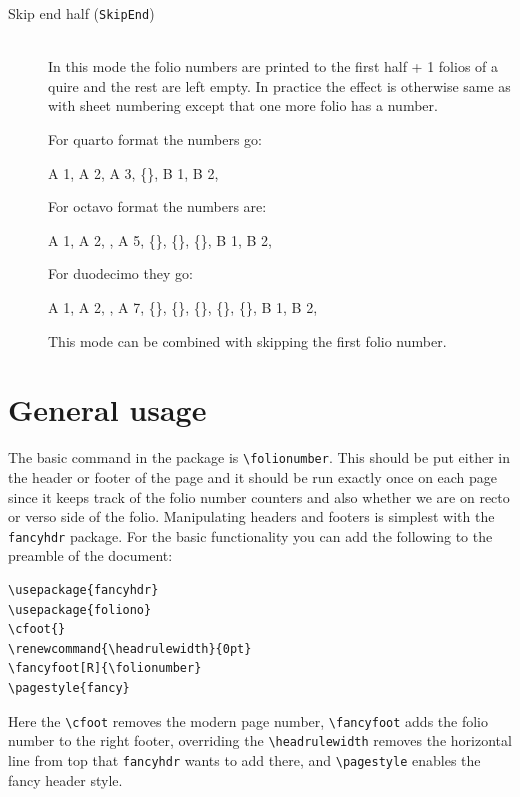\documentclass[a4paper, 12pt]{article}
\newcommand{\feature}[1]{\texttt{#1}}
\newcommand{\command}[1]{\texttt{\textbackslash{}#1}}
\begin{document}
\begin{description}
\item [Skip end half (\feature{SkipEnd})] \mbox{} \\
  In this mode the folio numbers are printed to the first half + 1
  folios of a quire and the rest are left empty. In practice the
  effect is otherwise same as with sheet numbering except that one
  more folio has a number.

  For quarto format the numbers go:
  \begin{center}
    A 1, A 2, A 3,  \{\}, B 1, B 2, \textellipsis
  \end{center}
  For octavo format the numbers are:
  \begin{center}
    A 1, A 2, \textellipsis, A 5,  \{\},  \{\},  \{\}, B 1, B 2, \textellipsis
  \end{center}
  For duodecimo they go:
  \begin{center}
    A 1, A 2, \textellipsis, A 7,  \{\},  \{\},  \{\}, \{\}, \{\}, B 1, B 2, \textellipsis
  \end{center}
  This mode can be combined with skipping the first folio number.   

\end{description}

\section{General usage}

The basic command in the package is \command{folionumber}. This should
be put either in the header or footer of the page and it should be run
exactly once on each page since it keeps track of the folio number
counters and also whether we are on recto or verso side of the folio.
Manipulating headers and footers is simplest with the
\feature{fancyhdr} package. For the basic functionality you can add
the following to the preamble of the document:

\begin{verbatim}
\usepackage{fancyhdr}
\usepackage{foliono}
\cfoot{}
\renewcommand{\headrulewidth}{0pt}
\fancyfoot[R]{\folionumber}
\pagestyle{fancy}
\end{verbatim}

Here the \command{cfoot} removes the modern page number,
\command{fancyfoot} adds the folio number to the right footer,
overriding the \command{headrulewidth} removes the horizontal line
from top that \feature{fancyhdr} wants to add there, and
\command{pagestyle} enables the fancy header style.
\end{document}
